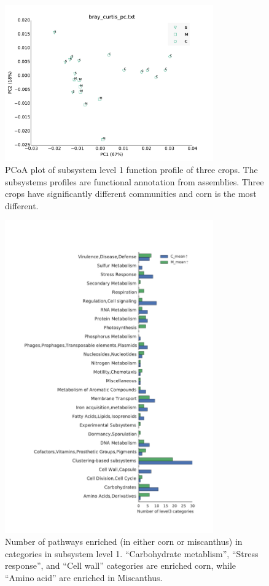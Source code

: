 \documentclass[12pt]{article}
\begin{document}
    \begin{figure}[tbph!]
    \centering
    \includegraphics[width=0.8\textwidth]{figures/subsys-l1-pcoa}
    \caption[PCoA plot based on subsystem profile]{PCoA plot of subsystem level 1 function profile of three crops. The subsystems profiles are functional annotation from assemblies. Three crops have significantly different communities and corn is the most different.}
    \label{fig:subsys-l1-pcoa}
    \end{figure}


    \begin{figure}[tbph!]
    \centering
    \includegraphics[width=0.8\textwidth]{figures/subsys-enrich-CvM}
    \caption[Number of pathways enriched in categories in subsystem level 1]{Number of pathways enriched (in either corn or miscanthus) in categories in subsystem level 1. ``Carbohydrate metablism'', ``Stress response'', and ``Cell wall'' categories are enriched corn, while ``Amino acid'' are enriched in Miscanthus.}
    \label{fig:subsys-enrich-CvM}
    \end{figure}
\end{document}
